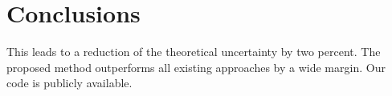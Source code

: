 \section{Conclusions}\label{sec:conclusions}

This leads to a reduction of the theoretical uncertainty by two percent.
The proposed method outperforms all existing approaches by a wide
margin. Our code is publicly available.

